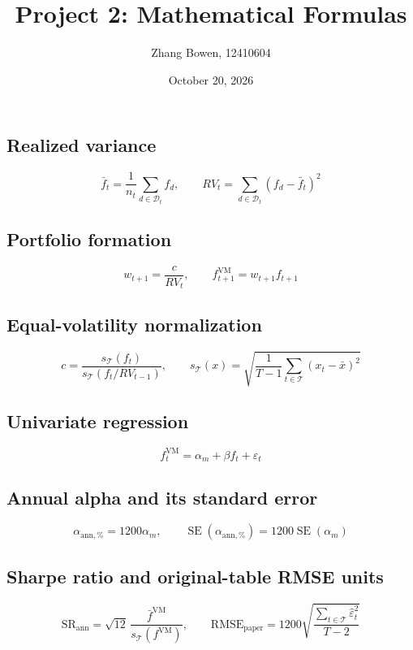 \documentclass[11pt]{article}
\title{Project 2: Mathematical Formulas}
\author{Zhang Bowen, 12410604}
\date{October 20, 2026}
\begin{document}
\maketitle
\subsection*{Realized variance}
\begin{equation}
\bar f_t=\frac{1}{n_t}\sum_{d\in\mathcal D_t}f_d,\qquad RV_t=\sum_{d\in\mathcal D_t}\left(f_d-\bar f_t\right)^2
\end{equation}
\subsection*{Portfolio formation}
\begin{equation}
w_{t+1}=\frac{c}{RV_t},\qquad f^{\mathrm{VM}}_{t+1}=w_{t+1}f_{t+1}
\end{equation}
\subsection*{Equal-volatility normalization}
\begin{equation}
c=\frac{s_{\mathcal T}(f_t)}{s_{\mathcal T}\!\left(f_t/RV_{t-1}\right)},\qquad s_{\mathcal T}(x)=\sqrt{\frac{1}{T-1}\sum_{t\in\mathcal T}(x_t-\bar x)^2}
\end{equation}
\subsection*{Univariate regression}
\begin{equation}
f_t^{\mathrm{VM}}=\alpha_m+\beta f_t+\varepsilon_t
\end{equation}
\subsection*{Annual alpha and its standard error}
\begin{equation}
\alpha_{\mathrm{ann},\%}=1200\alpha_m,\qquad \operatorname{SE}(\alpha_{\mathrm{ann},\%})=1200\operatorname{SE}(\alpha_m)
\end{equation}
\subsection*{Sharpe ratio and original-table RMSE units}
\begin{equation}
\mathrm{SR}_{\mathrm{ann}}=\sqrt{12}\,\frac{\bar f^{\mathrm{VM}}}{s_{\mathcal T}(f^{\mathrm{VM}})},\qquad \mathrm{RMSE}_{\mathrm{paper}}=1200\sqrt{\frac{\sum_{t\in\mathcal T}\hat\varepsilon_t^2}{T-2}}
\end{equation}
\end{document}
